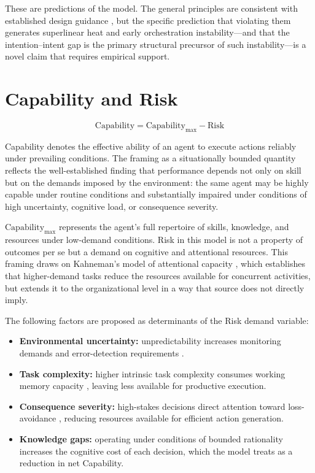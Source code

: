 \documentclass[12pt]{article}
\begin{document}
These are predictions of the model. The general principles are consistent with
established design guidance \citep{mintzberg1979structuring,
williamson1981economics}, but the specific prediction that violating them
generates superlinear heat and early orchestration instability---and that
the intention--intent gap is the primary structural precursor of such
instability---is a novel claim that requires empirical support.


\section{Capability and Risk}
\label{sec:capability}

\[
\text{Capability} = \text{Capability}_{\max} - \text{Risk}
\]

Capability denotes the effective ability of an agent to execute actions
reliably under prevailing conditions. The framing as a situationally bounded
quantity reflects the well-established finding that performance depends not
only on skill but on the demands imposed by the environment: the same agent
may be highly capable under routine conditions and substantially impaired
under conditions of high uncertainty, cognitive load, or consequence severity.

$\text{Capability}_{\max}$ represents the agent's full repertoire of skills,
knowledge, and resources under low-demand conditions. Risk in this model
is not a property of outcomes per se but a demand on cognitive and
attentional resources. This framing draws on Kahneman's model of
attentional capacity \citep{kahneman1973attention}, which establishes that
higher-demand tasks reduce the resources available for concurrent activities,
but extends it to the organizational level in a way that source does not
directly imply.

The following factors are proposed as determinants of the Risk demand variable:

\begin{itemize}
  \item \textbf{Environmental uncertainty:} unpredictability increases
    monitoring demands and error-detection requirements \citep{perrow1984normal}.
  \item \textbf{Task complexity:} higher intrinsic task complexity
    consumes working memory capacity \citep{sweller1994cognitive}, leaving
    less available for productive execution.
  \item \textbf{Consequence severity:} high-stakes decisions direct
    attention toward loss-avoidance \citep{kahneman1979prospect}, reducing
    resources available for efficient action generation.
  \item \textbf{Knowledge gaps:} operating under conditions of bounded
    rationality \citep{simon1972theories} increases the cognitive cost of
    each decision, which the model treats as a reduction in net Capability.
\end{itemize}
\end{document}
